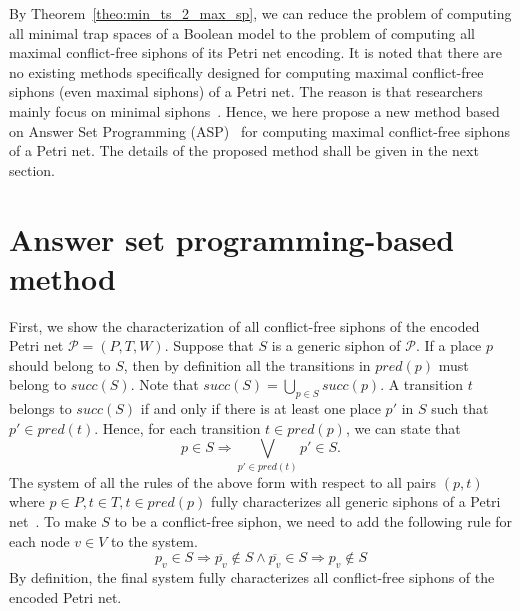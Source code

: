 \documentclass[runningheads]{llncs}
\begin{document}
By Theorem~\ref{theo:min_ts_2_max_sp}, we can reduce the problem of computing all minimal trap spaces of a Boolean model to the problem of computing all maximal conflict-free siphons of its Petri net encoding. It is noted that there are no existing methods specifically designed for computing maximal conflict-free siphons (even maximal siphons) of a Petri net. The reason is that researchers mainly focus on minimal siphons~\cite{DBLP:journals/isci/LiuB16}. Hence, we here propose a new method based on Answer Set Programming (ASP)~\cite{DBLP:journals/aicom/GebserKKOSS11} for computing maximal conflict-free siphons of a Petri net. The details of the proposed method shall be given in the next section.

\section{Answer set programming-based method}
First, we show the characterization of all conflict-free siphons of the encoded Petri net \(\mathcal{P} = (P, T, W)\). Suppose that \(S\) is a generic siphon of \(\mathcal{P}\). If a place \(p\) should belong to \(S\), then by definition all the transitions in \(pred(p)\) must belong to \(succ(S)\). Note that \(succ(S) = \bigcup_{p \in S}succ(p)\). A transition \(t\) belongs to \(succ(S)\) if and only if there is at least one place \(p'\) in \(S\) such that \(p' \in pred(t)\). Hence, for each transition \(t \in pred(p)\), we can state that
\begin{equation}
\label{eq:siphon}
p \in S \Rightarrow \bigvee_{p' \in pred(t)}p' \in S.
\end{equation}The system of all the rules of the above form with respect to all pairs \((p, t)\) where \(p \in P, t \in T, t \in pred(p)\) fully characterizes all generic siphons of a Petri net~\cite{nabli2016enumerating}. To make \(S\) to be a conflict-free siphon, we need to add the following rule for each node \(v \in V\) to the system.
\begin{equation}
\label{eq:conflict}
p_v \in S \Rightarrow \overline{p_v} \not \in S \wedge \overline{p_v} \in S \Rightarrow p_v \not \in S
\end{equation}By definition, the final system fully characterizes all conflict-free siphons of the encoded Petri net.
\end{document}
